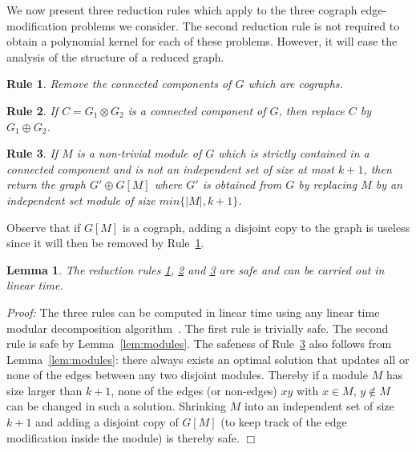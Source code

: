 \documentclass[11pt]{article}
\newenvironment{proof}{\noindent\textit{Proof: }}{{\hfill $\Box$}}
\newtheorem{lemma}{Lemma}[section]
\newtheorem{reduction}{Rule}
\begin{document}
We now present three reduction rules which apply to the three cograph edge-modification problems we consider. The second reduction rule is not required to obtain a polynomial kernel for each of these problems. However, it will ease the analysis of the structure of a reduced graph.

\begin{reduction} \label{rule1}
Remove the connected components of $G$ which are cographs.
\end{reduction}

\begin{reduction} \label{rule2}
If $C=G_1\otimes G_2$ is a connected component of $G$, then replace $C$ by $G_1\oplus G_2$.
\end{reduction}

\begin{reduction} \label{rule3}
If $M$ is a non-trivial module of $G$ which is strictly contained in a connected component and is not an independent set of size at most $k+1$, then return the graph $G'\oplus G[M]$ where $G'$ is obtained from $G$ by replacing $M$ by an independent set module of size $min\{|M|,k+1\}$.
\end{reduction}

Observe that if $G[M]$ is a cograph, adding a disjoint copy to the graph is useless since it will then  be removed by Rule~\ref{rule1}. 

\begin{lemma} \label{lem:rules}
The reduction rules \ref{rule1}, \ref{rule2} and \ref{rule3} are safe and can be carried out in linear time.
\end{lemma}

\begin{proof}
The three rules can be computed in linear time using any linear time modular decomposition algorithm~\cite{HP10}. 
The first rule is trivially safe. The second rule is safe by Lemma~\ref{lem:modules}. The safeness of Rule~\ref{rule3} also follows from Lemma~\ref{lem:modules}: there always exists an optimal solution that updates all or none of the edges between any two disjoint modules. Thereby if a module $M$ has size larger than $k+1$, none of the edges (or non-edges) $xy$ with $x\in M$, $y\notin M$ can be changed in such a solution. Shrinking $M$ into an independent set of size $k+1$ and adding a disjoint copy of $G[M]$ (to keep track of the edge modification inside the module) is thereby safe.
\end{proof}\\
\end{document}
